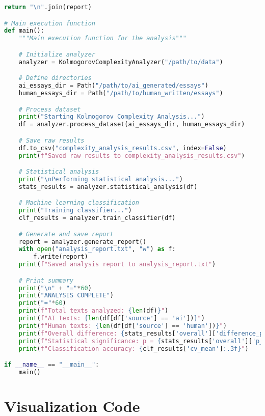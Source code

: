 \documentclass[12pt,a4paper]{report}
\begin{document}
\begin{lstlisting}[language=Python, caption=Complete Compression Analysis Framework]
        return "\n".join(report)

# Main execution function
def main():
    """Main execution function for the analysis"""

    # Initialize analyzer
    analyzer = KolmogorovComplexityAnalyzer("/path/to/data")

    # Define directories
    ai_essays_dir = Path("/path/to/ai_generated/essays")
    human_essays_dir = Path("/path/to/human_written/essays")

    # Process dataset
    print("Starting Kolmogorov Complexity Analysis...")
    df = analyzer.process_dataset(ai_essays_dir, human_essays_dir)

    # Save raw results
    df.to_csv("complexity_analysis_results.csv", index=False)
    print(f"Saved raw results to complexity_analysis_results.csv")

    # Statistical analysis
    print("\nPerforming statistical analysis...")
    stats_results = analyzer.statistical_analysis(df)

    # Machine learning classification
    print("Training classifier...")
    clf_results = analyzer.train_classifier(df)

    # Generate and save report
    report = analyzer.generate_report()
    with open("analysis_report.txt", "w") as f:
        f.write(report)
    print(f"Saved analysis report to analysis_report.txt")

    # Print summary
    print("\n" + "="*60)
    print("ANALYSIS COMPLETE")
    print("="*60)
    print(f"Total texts analyzed: {len(df)}")
    print(f"AI texts: {len(df[df['source'] == 'ai'])}")
    print(f"Human texts: {len(df[df['source'] == 'human'])}")
    print(f"Overall difference: {stats_results['overall']['difference_percent']:.1f}%")
    print(f"Statistical significance: p = {stats_results['overall']['p_value']:.6f}")
    print(f"Classification accuracy: {clf_results['cv_mean']:.3f}")

if __name__ == "__main__":
    main()
\end{lstlisting}

\section{Visualization Code}
\end{document}
